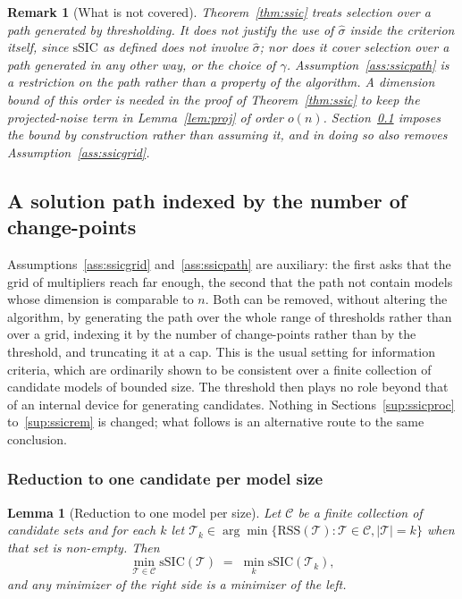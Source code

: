 \documentclass[12pt, a4paper]{article}
\newtheorem{lemma}{Lemma}[section]
\newtheorem{remark}{Remark}[section]
\begin{document}
\begin{remark}[What is not covered]
\label{rem:ssicnot}
Theorem~\ref{thm:ssic} treats selection over a path generated by thresholding.
It does not justify the use of $\hat\sigma$ inside the criterion itself, since
$\mathrm{sSIC}$ as defined does not involve $\hat\sigma$; nor does it cover
selection over a path generated in any other way, or the choice of $\gamma$.
Assumption~\ref{ass:ssicpath} is a restriction on the path rather than a
property of the algorithm. A dimension bound of this order is needed in the
proof of Theorem~\ref{thm:ssic} to keep the projected-noise term in
Lemma~\ref{lem:proj} of order $o(n)$. Section~\ref{sup:sizepath} imposes the
bound by construction rather than assuming it, and in doing so also removes
Assumption~\ref{ass:ssicgrid}.
\end{remark}


\subsection{A solution path indexed by the number of change-points}
\label{sup:sizepath}

Assumptions~\ref{ass:ssicgrid} and~\ref{ass:ssicpath} are auxiliary: the first
asks that the grid of multipliers reach far enough, the second that the path
not contain models whose dimension is comparable to $n$. Both can be removed,
without altering the algorithm, by generating the path over the whole range of
thresholds rather than over a grid, indexing it by the number of change-points
rather than by the threshold, and truncating it at a cap. This is the usual
setting for information criteria, which are ordinarily shown to be consistent
over a finite collection of candidate models of bounded size. The threshold
then plays no role beyond that of an internal device for generating candidates.
Nothing in Sections~\ref{sup:ssicproc} to~\ref{sup:ssicrem} is changed; what
follows is an alternative route to the same conclusion.

\subsubsection*{Reduction to one candidate per model size}

\begin{lemma}[Reduction to one model per size]
\label{lem:reduce}
Let $\mathcal{C}$ be a finite collection of candidate sets and for each $k$ let
$\mathcal{T}_k \in \arg\min\{\mathrm{RSS}(\mathcal{T}) : \mathcal{T} \in
\mathcal{C}, |\mathcal{T}| = k\}$ when that set is non-empty. Then
\[
\min_{\mathcal{T} \in \mathcal{C}} \mathrm{sSIC}(\mathcal{T})
\;=\; \min_{k} \mathrm{sSIC}(\mathcal{T}_k),
\]
and any minimizer of the right side is a minimizer of the left.
\end{lemma}
\end{document}
